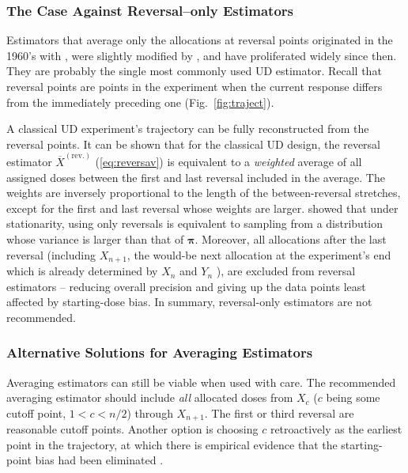 \subsubsection{The Case Against Reversal--only Estimators}

Estimators that average only the allocations at reversal points originated in the 1960's with \cite{Weth:Chen:Vasu:est:1966}, were slightly modified by \cite{Choi:est:1971}, and have proliferated widely since then. They are probably the single most commonly used UD estimator. Recall that reversal points are points in the experiment when the current response differs from the immediately preceding one (Fig.~\ref{fig:traject}).

A classical UD experiment's trajectory can be fully reconstructed from the reversal points. It can be shown that for the classical UD design, the reversal estimator $\overline{X}^\mathrm{(rev.)}$ (\ref{eq:reversav}) is equivalent to a \emph{weighted} average of all assigned doses between the first and last reversal included in the average. The weights are inversely proportional to the length of the between-reversal stretches, except for the first and last reversal whose weights are larger. \cite{Oron07} showed that under stationarity, using only reversals is equivalent to sampling from a distribution whose variance is larger than that of $\boldsymbol{\pi}$. Moreover, all allocations after the last reversal (including $X_{n+1}$, the would-be next allocation at the experiment's end which is already determined by $X_n$ and $Y_n$ \citep{BrownleeEtAl53}), are excluded from reversal estimators -- reducing overall precision and giving up the data points least affected by starting-dose bias. In summary, reversal-only estimators are not recommended.

\subsubsection{Alternative Solutions for Averaging Estimators}

Averaging estimators can still be viable when used with care. The recommended averaging estimator should include \emph{all} allocated doses from $X_c$ ($c$ being some cutoff point, $1<c<n/2$) through $X_{n+1}$. The first or third reversal are reasonable cutoff points. Another option is choosing $c$ retroactively as the earliest point in the trajectory, at which there is empirical evidence that the starting-point bias had been eliminated \citep[Section~3.3]{Oron07}.


